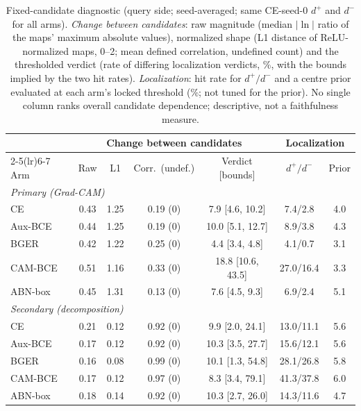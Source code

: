 \begin{table}[t]
\centering\footnotesize\setlength{\tabcolsep}{2.4pt}
\caption{Fixed-candidate diagnostic (query side; seed-averaged; same CE-seed-0 $d^+$ and $d^-$ for all arms). \emph{Change between candidates}: raw magnitude (median $|\ln|$ ratio of the maps' maximum absolute values), normalized shape (L1 distance of ReLU-normalized maps, 0--2; mean defined correlation, undefined count) and the thresholded verdict (rate of differing localization verdicts, \%, with the bounds implied by the two hit rates). \emph{Localization}: hit rate for $d^+/d^-$ and a centre prior evaluated at each arm's locked threshold (\%; not tuned for the prior). No single column ranks overall candidate dependence; descriptive, not a faithfulness measure.}
\label{tab:osld-a5}
\begin{tabular}{lcccccc}
\toprule
& \multicolumn{4}{c}{Change between candidates} & \multicolumn{2}{c}{Localization}\\
\cmidrule(lr){2-5}\cmidrule(lr){6-7}
Arm & Raw & L1 & Corr.\ (undef.) & Verdict [bounds] & $d^+/d^-$ & Prior\\
\midrule
\multicolumn{7}{l}{\emph{Primary (Grad-CAM)}}\\
CE & 0.43 & 1.25 & 0.19 (0) & 7.9 [4.6, 10.2] & 7.4/2.8 & 4.0\\
Aux-BCE & 0.44 & 1.25 & 0.19 (0) & 10.0 [5.1, 12.7] & 8.9/3.8 & 4.3\\
BGER & 0.42 & 1.22 & 0.25 (0) & 4.4 [3.4, 4.8] & 4.1/0.7 & 3.1\\
CAM-BCE & 0.51 & 1.16 & 0.33 (0) & 18.8 [10.6, 43.5] & 27.0/16.4 & 3.3\\
ABN-box & 0.45 & 1.31 & 0.13 (0) & 7.6 [4.5, 9.3] & 6.9/2.4 & 5.1\\
\multicolumn{7}{l}{\emph{Secondary (decomposition)}}\\
CE & 0.21 & 0.12 & 0.92 (0) & 9.9 [2.0, 24.1] & 13.0/11.1 & 5.6\\
Aux-BCE & 0.17 & 0.12 & 0.92 (0) & 10.3 [3.5, 27.7] & 15.6/12.1 & 5.6\\
BGER & 0.16 & 0.08 & 0.99 (0) & 10.1 [1.3, 54.8] & 28.1/26.8 & 5.8\\
CAM-BCE & 0.17 & 0.12 & 0.97 (0) & 8.3 [3.4, 79.1] & 41.3/37.8 & 6.0\\
ABN-box & 0.18 & 0.14 & 0.92 (0) & 10.3 [2.7, 26.0] & 14.3/11.6 & 4.7\\
\bottomrule
\end{tabular}
\end{table}
